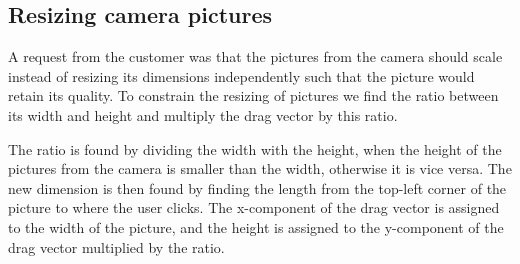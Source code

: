 \subsection{Resizing camera pictures}
A request from the customer was that the pictures from the camera should scale instead of resizing its dimensions independently such that the picture would retain its quality.
To constrain the resizing of pictures we find the ratio between its width and height and multiply the drag vector by this ratio.

The ratio is found by dividing the width with the height, when the height of the pictures from the camera is smaller than the width, otherwise it is vice versa.
The new dimension is then found by finding the length from the top-left corner of the picture to where the user clicks.
The x-component of the drag vector is assigned to the width of the picture, and the height is assigned to the y-component of the drag vector multiplied by the ratio.